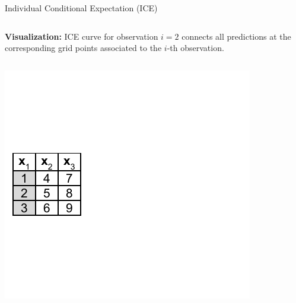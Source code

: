 \documentclass[11pt,compress,t,notes=noshow, xcolor=table]{beamer}
\begin{document}
\begin{vbframe}{Individual Conditional Expectation (ICE)}
\begin{columns}[T]
\begin{column}{0.45\textwidth}
\end{column}
\end{columns}
\vspace*{\topsep}

\textbf{Visualization:} ICE curve for observation $i=2$ connects all predictions at the corresponding grid points associated to the $i$-th observation.

\framebreak

\begin{columns}[T]
\begin{column}{0.55\textwidth}
\vspace*{-\topsep}
\vspace*{0.5\lineskip}
\includegraphics[page=7, trim=-3.69cm 0cm 3.69cm 0cm, width=\textwidth]{figure_man/ice_pd_plot_demo}
\end{column}
\begin{column}{0.45\textwidth}


\end{column}
\end{columns}
\end{vbframe}
\end{document}

